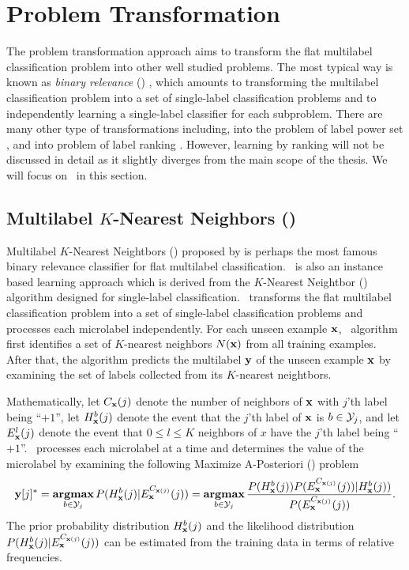 {%
%
\section{Problem Transformation}

The problem transformation approach aims to transform the flat multilabel classification problem into other well studied problems.
The most typical way is known as \textit{binary relevance} (\br) \citep{Tsoumakas07multi,Tsoumakas10mining}, which amounts to transforming the multilabel classification problem into a set of single-label classification problems and to independently learning a single-label classifier for each subproblem.
There are many other type of transformations including, into the problem of label power set \citep{Tsoumakas07random}, and into problem of label ranking \citep{Elisseeff01akernel,Brinker07case,Furnkranz08multilabel,Chiang12a}.
However, learning by ranking will not be discussed in detail as it slightly diverges from the main scope of the thesis.
We will focus on \br\ in this section.



%
%
\subsection{Multilabel $K$-Nearest Neighbors (\mlknn)} \label{sc_mlknn}

Multilabel $K$-Nearest Neightbors (\mlknn) proposed by \citet{Zhang05a,Zhang07mlknn} is perhaps the most famous binary relevance classifier for flat multilabel classification.
\mlknn\ is also an instance based learning approach \citep{Aha91instance} which is derived from the $K$-Nearest Neightbor (\knn) algorithm designed for single-label classification.
\mlknn\ transforms the flat multilabel classification problem into a set of single-label classification problems and processes each microlabel independently.
For each unseen example $\mathbf {x}$, \mlknn\ algorithm first identifies a set of $K$-nearest neighbors $N(\mathbf {x})$ from all training examples.
After that, the algorithm predicts the multilabel $\mathbf {y}$ of the unseen example $\mathbf {x}$ by examining the set of labels collected from its $K$-nearest neightbors.

Mathematically,
let $C_{\mathbf {x}}(j)$ denote the number of neighbors of $\mathbf {x}$ with $j$'th label being ``$+1$'',
let $H^b_{\mathbf {x}}(j)$ denote the event that the $j$'th label of $\mathbf {x}$ is $b\in\mathcal{Y}_j$,
and let $E_{\mathbf {x}}^l(j)$ denote the event that $0\le l \le K$ neighbors of $x$ have the $j$'th label being ``$+1$''.
\mlknn\ processes each microlabel at a time and determines the value of the microlabel by examining the following Maximize A-Posteriori (\map) problem
\begin{align*}
	\mathbf {y}[j]^* = \underset{b\in\mathcal{Y}_j}{\textbf{argmax}} \, P( H^b_{\mathbf {x}}(j) | E_{\mathbf {x}}^{C_{\mathbf {x}(j)}}(j) )
	= \underset{b\in\mathcal{Y}_j}{\textbf{argmax}} \, \frac{P( H^b_{\mathbf {x}}(j) ) P(  E_{\mathbf {x}}^{C_{\mathbf {x}(j)}}(j) ) | H^b_{\mathbf {x}}(j))}{P( E_{\mathbf {x}}^{C_{\mathbf {x}(j)}}(j))}.
\end{align*}
The prior probability distribution $H^b_{\mathbf {x}}(j)$ and the likelihood distribution $P( H^b_{\mathbf {x}}(j) | E_{\mathbf {x}}^{C_{\mathbf {x}(j)}}(j) )$ can be estimated from the training data in terms of relative frequencies.

}
